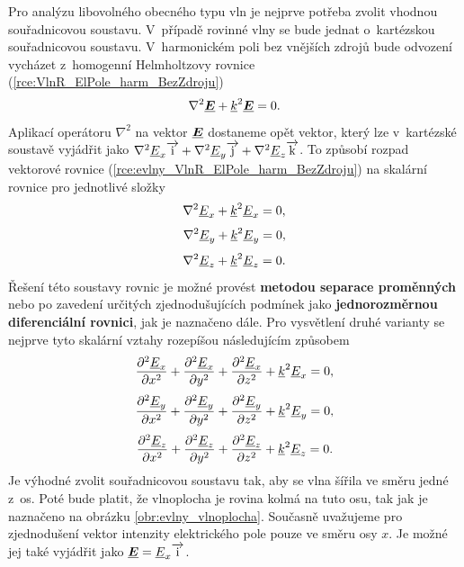 Pro analýzu libovolného obecného typu vln je nejprve potřeba zvolit vhodnou souřadnicovou soustavu. V~případě rovinné vlny se bude jednat o~kartézskou souřadnicovou soustavu. V~harmonickém poli bez vnějších zdrojů bude odvození vycházet z~homogenní Helmholtzovy rovnice (\ref{rce:VlnR_ElPole_harm_BezZdroju})
\begin{equation}
	\nabla^{2}\mbox{\underline{\boldmath$E$}} + {\underline{k}}^{2}\mbox{\underline{\boldmath$E$}} = 0.
	\label{rce:evlny_VlnR_ElPole_harm_BezZdroju}
\end{equation}
Aplikací operátoru $\nabla^{2}$ na vektor $\mbox{\underline{\boldmath$E$}}$ dostaneme opět vektor, který lze v~kartézské soustavě vyjádřit jako $\nabla^{2}{\underline{E}}_{x}\overrightarrow{\mathrm{i}} + \nabla^{2} {\underline{E}}_{y}\overrightarrow{\mathrm{j}} + \nabla^{2}{\underline{E}}_{z}\overrightarrow{\mathrm{k}}$. To způsobí rozpad vektorové rovnice (\ref{rce:evlny_VlnR_ElPole_harm_BezZdroju}) na skalární rovnice pro jednotlivé složky
\begin{displaymath}
	\nabla^{2} {\underline{E}}_{x} +{\underline{k}}^{2} {\underline{E}}_{x} = 0,
\end{displaymath}
\begin{displaymath}
	\nabla^{2} {\underline{E}}_{y} +{\underline{k}}^{2} {\underline{E}}_{y} = 0,
\end{displaymath}
\begin{displaymath}
	\nabla^{2} {\underline{E}}_{z} +{\underline{k}}^{2} {\underline{E}}_{z} = 0.
\end{displaymath}
Řešení této soustavy rovnic je možné provést {\bf metodou separace proměnných} nebo po zavedení určitých zjednodušujících podmínek jako {\bf jednorozměrnou diferenciální rovnici}, jak je naznačeno dále. Pro vysvětlení druhé varianty se nejprve tyto skalární vztahy rozepíšou následujícím způsobem
\begin{equation}
	\frac{\partial ^{2} {\underline{E}}_{x}}{\partial x^{2}} + \frac{\partial ^{2}{\underline{E}}_{x}}{\partial y^{2}} + \frac{\partial ^{2}{\underline{E}}_{x}}{\partial z^{2}} + {\underline{k}}^{2} {\underline{E}}_{x} = 0,
	\label{rce:evlny_skalarni1}
\end{equation}
\begin{equation}
	\frac{\partial ^{2} {\underline{E}}_{y}}{\partial x^{2}} + \frac{\partial ^{2} {\underline{E}}_{y}}{\partial y^{2}} + \frac{\partial ^{2} {\underline{E}}_{y}}{\partial z^{2}} + {\underline{k}}^{2} {\underline{E}}_{y} = 0,
	\label{rce:evlny_skalarni2}
\end{equation}
\begin{equation}
	\frac{\partial ^{2} {\underline{E}}_{z}}{\partial x^{2}} + \frac{\partial ^{2} {\underline{E}}_{z}}{\partial y^{2}} + \frac{\partial ^{2} {\underline{E}}_{z}}{\partial z^{2}} + {\underline{k}}^{2} {\underline{E}}_{z} = 0.
	\label{rce:evlny_skalarni3}	
\end{equation}
Je výhodné zvolit souřadnicovou soustavu tak, aby se vlna šířila ve směru jedné z~os. Poté bude platit, že vlnoplocha je rovina kolmá na tuto osu, tak jak je naznačeno na obrázku \ref{obr:evlny_vlnoplocha}. Současně uvažujeme pro zjednodušení vektor intenzity elektrického pole pouze ve směru osy $x$. Je možné jej také vyjádřit jako $\mbox{\underline{\boldmath$E$}} = {\underline{E}}_{x}\overrightarrow{\mathrm{i}}$.

